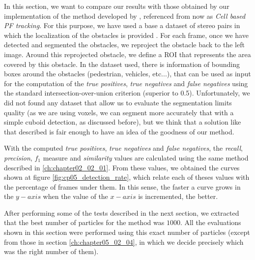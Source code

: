 In this section, we want to compare our results with those obtained by our implementation of the method developed by \cite{danescu2012particle}, referenced from now as \emph{Cell based PF tracking}. For this purpose, we have used a base a dataset of stereo pairs in which the localization of the obstacles is provided \citep{geiger2013vision}. For each frame, once we have detected and segmented the obstacles, we reproject the obstacle back to the left image. Around this reprojected obstacle, we define a \ac{ROI} that represents the area covered by this obstacle. In the dataset used, there is information of bounding boxes around the obstacles (pedestrian, vehicles, etc...), that can be used as input for the computation of the \emph{true positives}, \emph{true negatives} and \emph{false negatives} using the standard intersection-over-union criterion (superior to 0.5). Unfortunately, we did not found any dataset that allow us to evaluate the segmentation limits quality (as we are using voxels, we can segment more accurately that with a simple cuboid detection, as discussed before), but we think that a solution like that described is fair enough to have an idea of the goodness of our method. 

With the computed \emph{true positives}, \emph{true negatives} and \emph{false negatives}, the \emph{recall}, \emph{precision}, \emph{$f_1$} measure and \emph{similarity} values are calculated using the same method described in \ref{ch:chapter02_02_01}. From these values, we obtained the curves shown at figure \ref{fig:cp05_detection_rate}, which relate each of theses values with the percentage of frames under them. In this sense, the faster a curve grows in the $y-axis$ when the value of the $x-axis$ is incremented, the better.

After performing some of the tests described in the next section, we extracted that the best number of particles for the method was $1000$. All the evaluations shown in this section were performed using this exact number of particles (except from those in section \ref{ch:chapter05_02_04}, in which we decide precisely which was the right number of them).

